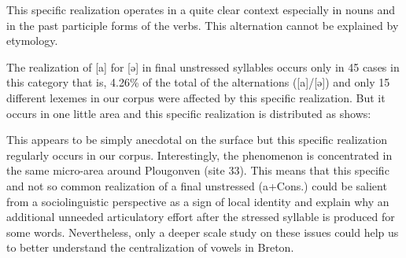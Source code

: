 \documentclass[output=paper]{LSP/langsci}
\begin{document}
This specific realization operates in a quite clear context especially in nouns and in the past participle forms of the verbs. This alternation cannot be explained by etymology. 

The realization of [a] for [ə] in final unstressed syllables occurs only in 45 cases in this category that is, 4.26\% of the total of the alternations ([a]/[ə]) and only 15 different lexemes in our corpus were affected by this specific realization. But it occurs in one little area and this specific realization is distributed as  shows:

\begin{table}
\label{tab:7}
\caption{Distribution of the different occurrences of (a+Cons.) according to the location investigated}
\end{table}

This appears to be simply anecdotal on the surface but this specific realization regularly occurs in our corpus. Interestingly, the phenomenon is concentrated in the same micro-area around Plougonven (site 33). This means that this specific and not so common realization of a final unstressed (a+Cons.) could be salient from a sociolinguistic perspective as a sign of local identity and explain why an additional unneeded articulatory effort after the stressed syllable is produced for some words. Nevertheless, only a deeper scale study on these issues could help us to better understand the centralization of vowels in Breton.
\end{document}
